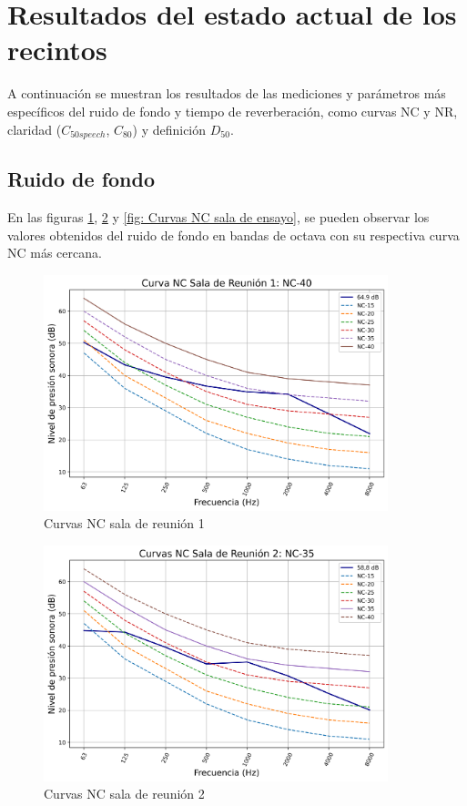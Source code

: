 \section{Resultados del estado actual de los recintos}
A continuación se muestran los resultados de las mediciones y parámetros más específicos del ruido de fondo y tiempo de reverberación, como curvas NC y NR, claridad ($C_{50speech}$, $C_{80}$) y definición $D_{50}$.
\subsection{Ruido de fondo}
En las figuras \ref{fig: Curvas NC sala 1}, \ref{fig: Curvas NC sala 2} y \ref{fig: Curvas NC sala de ensayo}, se pueden observar los valores obtenidos del ruido de fondo en bandas de octava con su respectiva curva NC más cercana.
    \begin{figure}[H]
        \centering
        \includegraphics[width=10cm]{Imagenes/Resultados/Curvas NC-NR/NC reunion 1.png}
        \caption{Curvas NC sala de reunión 1}
        \label{fig: Curvas NC sala 1}
    \end{figure}

    \begin{figure}[H]
        \centering
        \includegraphics[width=10cm]{Imagenes/Resultados/Curvas NC-NR/NC reunion 2.png}
        \caption{Curvas NC sala de reunión 2}
        \label{fig: Curvas NC sala 2}
    \end{figure}

